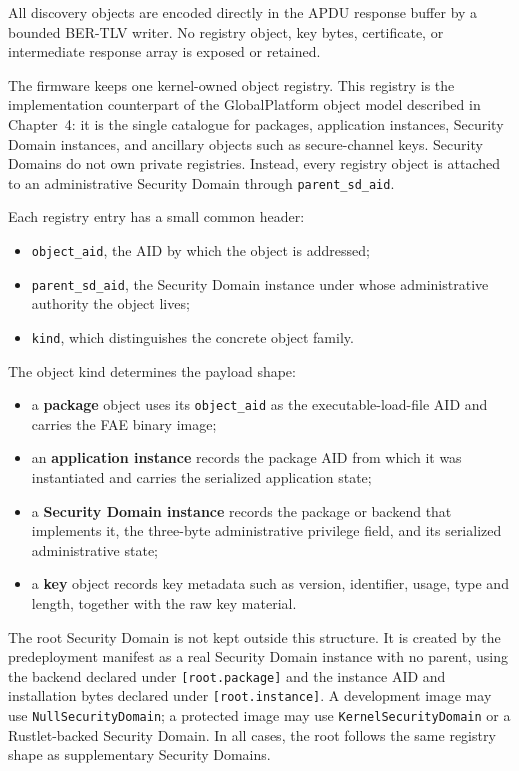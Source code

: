 All discovery objects are encoded directly in the APDU response buffer by a
bounded BER-TLV writer. No registry object, key bytes, certificate, or
intermediate response array is exposed or retained.

The firmware keeps one kernel-owned object registry. This registry is the
implementation counterpart of the GlobalPlatform object model described in
Chapter~4: it is the single catalogue for packages, application instances,
Security Domain instances, and ancillary objects such as secure-channel keys.
Security Domains do not own private registries. Instead, every registry object
is attached to an administrative Security Domain through
\texttt{parent\_sd\_aid}.

Each registry entry has a small common header:
\begin{itemize}
\item \texttt{object\_aid}, the AID by which the object is addressed;
\item \texttt{parent\_sd\_aid}, the Security Domain instance under whose
  administrative authority the object lives;
\item \texttt{kind}, which distinguishes the concrete object family.
\end{itemize}

The object kind determines the payload shape:
\begin{itemize}
\item a \textbf{package} object uses its \texttt{object\_aid} as the
  executable-load-file AID and carries the FAE binary image;
\item an \textbf{application instance} records the package AID from which it
  was instantiated and carries the serialized application state;
\item a \textbf{Security Domain instance} records the package or backend that
  implements it, the three-byte administrative privilege field, and its
  serialized administrative state;
\item a \textbf{key} object records key metadata such as version, identifier,
  usage, type and length, together with the raw key material.
\end{itemize}

The root Security Domain is not kept outside this structure. It is created by
the predeployment manifest as a real Security Domain instance with no parent,
using the backend declared under \texttt{[root.package]} and the instance AID
and installation bytes declared under \texttt{[root.instance]}. A development
image may use \texttt{NullSecurityDomain}; a protected image may use
\texttt{KernelSecurityDomain} or a Rustlet-backed Security Domain. In all
cases, the root follows the same registry shape as supplementary Security
Domains.

